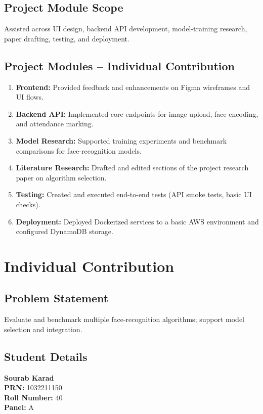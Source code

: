 \documentclass[openany]{report}
\begin{document}
\section{Project Module Scope}
Assisted across UI design, backend API development, model-training research, paper drafting, testing, and deployment.

\section{Project Modules – Individual Contribution}
\begin{enumerate}
  \item \textbf{Frontend:} Provided feedback and enhancements on Figma wireframes and UI flows.
  \item \textbf{Backend API:} Implemented core endpoints for image upload, face encoding, and attendance marking.
  \item \textbf{Model Research:} Supported training experiments and benchmark comparisons for face-recognition models.
  \item \textbf{Literature Research:} Drafted and edited sections of the project research paper on algorithm selection.
  \item \textbf{Testing:} Created and executed end-to-end tests (API smoke tests, basic UI checks).
  \item \textbf{Deployment:} Deployed Dockerized services to a basic AWS environment and configured DynamoDB storage.
\end{enumerate}
\chapter{Individual Contribution}
\section{Problem Statement}
Evaluate and benchmark multiple face-recognition algorithms; support model selection and integration.

\section{Student Details}
\textbf{Sourab Karad} \\
\textbf{PRN:} 1032211150 \\
\textbf{Roll Number:} 40 \\
\textbf{Panel:} A \\
\end{document}
